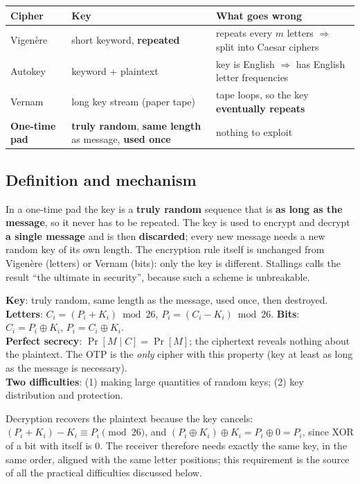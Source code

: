 \begin{center}\small
\begin{tabularx}{\textwidth}{@{}l X X@{}}
\toprule
Cipher & Key & What goes wrong\\
\midrule
Vigen\`ere & short keyword, \textbf{repeated} & repeats every $m$ letters $\Rightarrow$ split into Caesar ciphers\\
Autokey & keyword + plaintext & key is English $\Rightarrow$ has English letter frequencies\\
Vernam & long key stream (paper tape) & tape loops, so the key \textbf{eventually repeats}\\
\textbf{One-time pad} & \textbf{truly random}, \textbf{same length} as message, \textbf{used once} & nothing to exploit\\
\bottomrule
\end{tabularx}
\end{center}

\subsection{Definition and mechanism}
In a one-time pad the key is a \textbf{truly random} sequence that is \textbf{as long as the message}, so it never has to be repeated. The key is used to encrypt and decrypt \textbf{a single message} and is then \textbf{discarded}; every new message needs a new random key of its own length. The encryption rule itself is unchanged from Vigen\`ere (letters) or Vernam (bits): only the key is different. Stallings calls the result ``the ultimate in security'', because such a scheme is unbreakable.

\begin{mustknow}
\textbf{Key}: truly random, same length as the message, used once, then destroyed.\\[2pt]
\textbf{Letters}: $C_i = (P_i + K_i) \bmod 26$, \;$P_i = (C_i - K_i) \bmod 26$. \qquad \textbf{Bits}: $C_i = P_i \oplus K_i$, \;$P_i = C_i \oplus K_i$.\\[2pt]
\textbf{Perfect secrecy}: $\Pr[M \mid C] = \Pr[M]$; the ciphertext reveals nothing about the plaintext. The OTP is the \emph{only} cipher with this property (key at least as long as the message is necessary).\\[2pt]
\textbf{Two difficulties}: (1) making large quantities of random keys; (2) key distribution and protection.
\end{mustknow}

Decryption recovers the plaintext because the key cancels: $(P_i + K_i) - K_i \equiv P_i \pmod{26}$, and $(P_i \oplus K_i) \oplus K_i = P_i \oplus 0 = P_i$, since XOR of a bit with itself is 0. The receiver therefore needs exactly the same key, in the same order, aligned with the same letter positions; this requirement is the source of all the practical difficulties discussed below.

